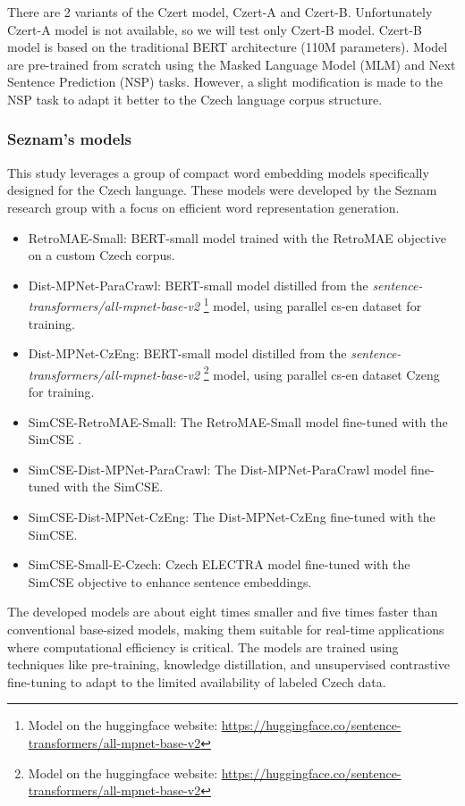 There are 2 variants of the Czert model, Czert-A and Czert-B. Unfortunately Czert-A model is not available, so we will test only Czert-B model.
Czert-B model is based on the traditional \ac{BERT} architecture (110M parameters).
Model are pre-trained from scratch using the Masked Language Model (MLM) and Next Sentence Prediction (NSP) tasks. However, a slight modification is made to the NSP task to adapt it better to the Czech language corpus structure.


\subsubsection{Seznam's models \cite{seznam-models}}
This study leverages a group of compact word embedding models specifically designed for the Czech language.
These models were developed by the Seznam research group with a focus on efficient word representation generation.

\begin{itemize}
  \item RetroMAE-Small: \ac{BERT}-small model trained with the \ac{RetroMAE} objective \cite{RetroMAE} on a custom Czech corpus.
  \item Dist-MPNet-ParaCrawl: \ac{BERT}-small model distilled from the \textit{sentence-transformers/all-mpnet-base-v2} \footnote{Model on the huggingface website: \url{https://huggingface.co/sentence-transformers/all-mpnet-base-v2}} model, using parallel cs-en dataset  \cite{ParaCrawl} for training.
  \item Dist-MPNet-CzEng: \ac{BERT}-small model distilled from the \textit{sentence-transformers/all-mpnet-base-v2} \footnote{Model on the huggingface website: \url{https://huggingface.co/sentence-transformers/all-mpnet-base-v2}} model, using parallel cs-en dataset Czeng \cite{CzEng_dataset} for training.
  \item SimCSE-RetroMAE-Small: The \ac{RetroMAE}-Small model fine-tuned with the \ac{SimCSE} \cite{SimCSE}.
  \item SimCSE-Dist-MPNet-ParaCrawl: The Dist-MPNet-ParaCrawl model fine-tuned with the \ac{SimCSE}.
  \item SimCSE-Dist-MPNet-CzEng: The Dist-MPNet-CzEng fine-tuned with the \ac{SimCSE}.
  \item SimCSE-Small-E-Czech: Czech ELECTRA model \cite{small-e-czech} fine-tuned with the \ac{SimCSE} objective to enhance sentence embeddings.
\end{itemize}

The developed models are about eight times smaller and five times faster than conventional base-sized models, making them suitable for real-time applications where computational efficiency is critical.
The models are trained using techniques like pre-training, knowledge distillation, and unsupervised contrastive fine-tuning to adapt to the limited availability of labeled Czech data.



